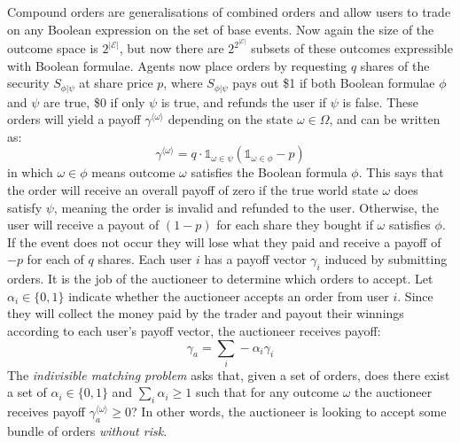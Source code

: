 Compound orders are generalisations of combined orders and allow users to trade
on any Boolean expression on the set of base events. Now again the size of the
outcome space is $2^\mathcal{|E|}$, but now there are $2^{2^\mathcal{|E|}}$
subsets of these outcomes expressible with Boolean formulae. Agents now place
orders by requesting $q$ shares of the security $S_{\phi|\psi}$ at share price
$p$, where $S_{\phi|\psi}$ pays out \$1 if both Boolean formulae $\phi$ and
$\psi$ are true, \$0 if only $\psi$ is true, and refunds the user if $\psi$ is
false. These orders will yield a payoff $\gamma^{\langle \omega \rangle}$
depending on the state $\omega \in \Omega$, and can be written as:
%
\[
	\gamma^{\langle \omega \rangle} = q \cdot \mathds{1}_{\omega \in \psi}
	(\mathds{1}_{\omega \in \phi} - p)
\]
%
in which $\omega \in \phi$ means outcome $\omega$ satisfies the Boolean formula
$\phi$. This says that the order will receive an overall payoff of zero if the
true world state $\omega$ does satisfy $\psi$, meaning the order is invalid and
refunded to the user. Otherwise, the user will receive a payout of $(1-p)$ for
each share they bought if $\omega$ satisfies $\phi$. If the event does not
occur they will lose what they paid and receive a payoff of $-p$ for each of
$q$ shares. Each user $i$ has a payoff vector $\gamma_i$ induced by submitting
orders. It is the job of the auctioneer to determine which orders to accept.
Let $\alpha_i \in \{0,1\}$ indicate whether the auctioneer accepts an order
from user $i$. Since they will collect the money paid by the trader and payout
their winnings according to each user's payoff vector, the auctioneer receives
payoff:
%
\[
	\gamma_a = \sum_i -\alpha_i \gamma_i
\]
%
The \emph{indivisible matching problem} asks that, given a set of orders, does
there exist a set of $\alpha_i \in \{0,1\}$ and $\sum_i \alpha_i \ge 1$ such
that for any outcome $\omega$ the auctioneer receives payoff $\gamma_a^{\langle
\omega \rangle} \ge 0$? In other words, the auctioneer is looking to accept
some bundle of orders \emph{without risk}.

